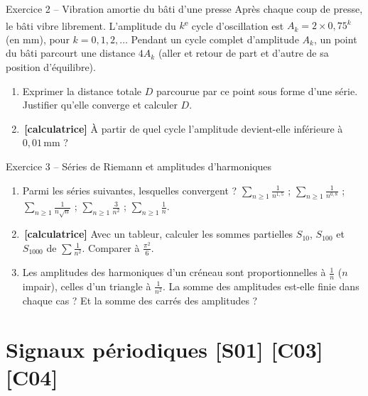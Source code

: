 \documentclass[a4paper,11pt]{article}
\newcommand{\calc}{\,{\color{uimmred}\small\textbf{[calculatrice]}}}
\begin{document}
\begin{exo}{Exercice 2 -- Vibration amortie du bâti d'une presse}
\label{exo:2}
Après chaque coup de presse, le bâti vibre librement. L'amplitude du $k$\textsuperscript{e} cycle d'oscillation est $A_k = 2\times 0{,}75^{k}$ (en mm), pour $k = 0, 1, 2, \dots$ Pendant un cycle complet d'amplitude $A_k$, un point du bâti parcourt une distance $4A_k$ (aller et retour de part et d'autre de sa position d'équilibre).
\begin{enumerate}[label=\alph*)]
  \item Exprimer la distance totale $D$ parcourue par ce point sous forme d'une série. Justifier qu'elle converge et calculer $D$.
  \item \calc{} À partir de quel cycle l'amplitude devient-elle inférieure à $0{,}01$\,mm ?
\end{enumerate}
\end{exo}

\begin{exo}{Exercice 3 -- Séries de Riemann et amplitudes d'harmoniques}
\label{exo:3}
\begin{enumerate}[label=\alph*)]
  \item Parmi les séries suivantes, lesquelles convergent ?
  \quad $\displaystyle\sum_{n\geq1}\frac{1}{n^{1{,}5}}$ ; \quad $\displaystyle\sum_{n\geq1}\frac{1}{n^{0{,}8}}$ ; \quad $\displaystyle\sum_{n\geq1}\frac{1}{n\sqrt n}$ ; \quad $\displaystyle\sum_{n\geq1}\frac{3}{n^2}$ ; \quad $\displaystyle\sum_{n\geq1}\frac{1}{n}$.
  \item \calc{} Avec un tableur, calculer les sommes partielles $S_{10}$, $S_{100}$ et $S_{1000}$ de $\sum\frac1{n^2}$. Comparer à $\frac{\pi^2}{6}$.
  \item Les amplitudes des harmoniques d'un créneau sont proportionnelles à $\frac1n$ ($n$ impair), celles d'un triangle à $\frac{1}{n^2}$. La somme des amplitudes est-elle finie dans chaque cas ? Et la somme des carrés des amplitudes ?
\end{enumerate}
\end{exo}

\needspace{7cm}
\section{Signaux périodiques \hfill {\normalsize\color{uimmred}[S01] [C03] [C04]}}
\end{document}
